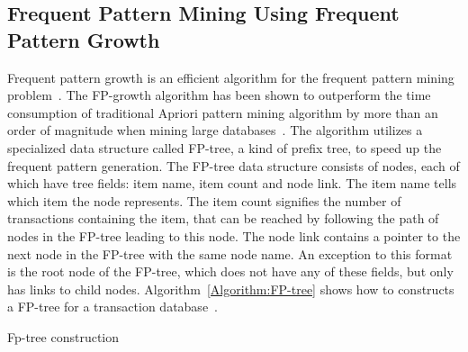 \subsection[Frequent Pattern Mining Using Frequent Pattern Growth]{Frequent Pattern Mining Using Frequent\\ Pattern Growth}

Frequent pattern growth is an efficient algorithm for the frequent pattern mining problem~\cite{Han:2000:MFP:335191.335372}. The FP-growth algorithm has been shown to outperform the time consumption of traditional Apriori pattern mining algorithm by more than an order of magnitude when mining large databases~\cite{Han:2000:MFP:335191.335372}. The algorithm utilizes a specialized data structure called FP-tree, a kind of prefix tree, to speed up the frequent pattern generation. The FP-tree data structure consists of nodes, each of which have tree fields: item name, item count and node link. The item name tells which item the node represents. The item count signifies the number of transactions containing the item, that can be reached by following the path of nodes in the FP-tree leading to this node. The node link contains a pointer to the next node in the FP-tree with the same node name. An exception to this format is the root node of the FP-tree, which does not have any of these fields, but only has links to child nodes. Algorithm~\ref{Algorithm:FP-tree} shows how to constructs a FP-tree for a transaction database~\cite{Han:2000:MFP:335191.335372}.

\begin{algorithm}[!htbp]
	\SetAlgoLined\DontPrintSemicolon
	\setcounter{AlgoLine}{0}
	\caption{Fp-tree construction}
	\label{Algorithm:FP-tree}
\end{algorithm}  

